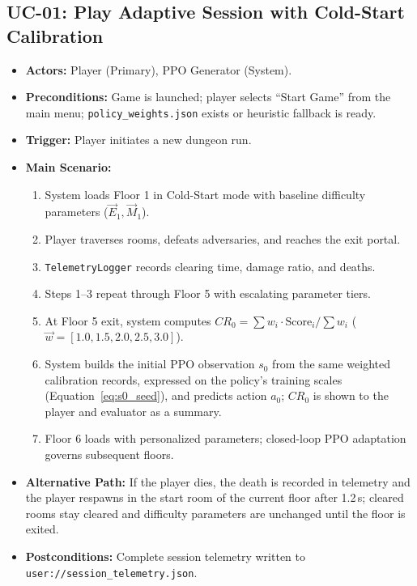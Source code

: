 \subsection{UC-01: Play Adaptive Session with Cold-Start Calibration}
\begin{itemize}
    \item \textbf{Actors:} Player (Primary), PPO Generator (System).
    \item \textbf{Preconditions:} Game is launched; player selects ``Start Game'' from the main menu; \texttt{policy\_weights.json} exists or heuristic fallback is ready.
    \item \textbf{Trigger:} Player initiates a new dungeon run.
    \item \textbf{Main Scenario:}
    \begin{enumerate}
        \item System loads Floor 1 in Cold-Start mode with baseline difficulty parameters ($\vec{E}_1, \vec{M}_1$).
        \item Player traverses rooms, defeats adversaries, and reaches the exit portal.
        \item \texttt{TelemetryLogger} records clearing time, damage ratio, and deaths.
        \item Steps 1--3 repeat through Floor 5 with escalating parameter tiers.
        \item At Floor 5 exit, system computes $CR_0 = \sum w_i \cdot \text{Score}_i / \sum w_i$ ($\vec{w} = [1.0, 1.5, 2.0, 2.5, 3.0]$).
        \item System builds the initial PPO observation $s_0$ from the same weighted calibration records, expressed on the policy's training scales (Equation~\ref{eq:s0_seed}), and predicts action $a_0$; $CR_0$ is shown to the player and evaluator as a summary.
        \item Floor 6 loads with personalized parameters; closed-loop PPO adaptation governs subsequent floors.
    \end{enumerate}
    \item \textbf{Alternative Path:} If the player dies, the death is recorded in telemetry and the player respawns in the start room of the current floor after 1.2\,s; cleared rooms stay cleared and difficulty parameters are unchanged until the floor is exited.
    \item \textbf{Postconditions:} Complete session telemetry written to \texttt{user://session\_telemetry.json}.
\end{itemize}

